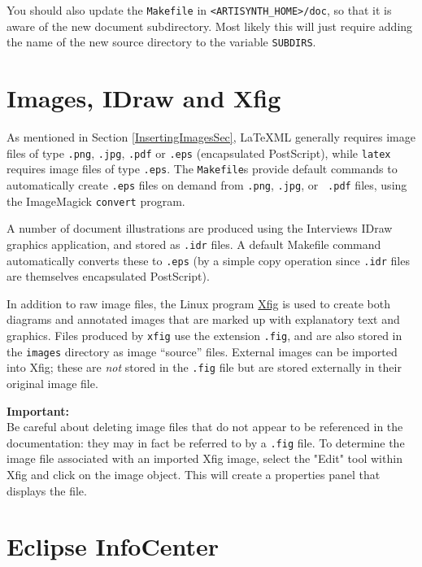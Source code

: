 \documentclass{article}
\begin{document}
You should also update the {\tt Makefile} in {\tt <ARTISYNTH\_HOME>/doc},
so that it is aware of the new document subdirectory. Most
likely this will just require adding the name of the new source
directory to the variable {\tt SUBDIRS}.

\section{Images, IDraw and Xfig}
\label{ImagesSec}

As mentioned in Section \ref{InsertingImagesSec}, LaTeXML generally
requires image files of type {\tt .png}, {\tt .jpg}, {\tt .pdf} or
{\tt .eps} (encapsulated PostScript), while 
{\tt latex} requires image files of type {\tt .eps}. 
The {\tt Makefile}s provide default commands to automatically
create {\tt .eps} files on demand from {\tt .png}, {\tt .jpg}, or {\tt
.pdf} files, using the ImageMagick {\tt convert} program. 

A number of document illustrations are produced using the Interviews
IDraw graphics application, and stored as {\tt .idr} files. A default
Makefile command automatically converts these to {\tt .eps} (by a
simple copy operation since {\tt .idr} files are themselves
encapsulated PostScript).

In addition to raw image files, the Linux program
\href{http://www.xfig.org}{Xfig} is used to create both diagrams and
annotated images that are marked up with explanatory text and
graphics.  Files produced by {\tt xfig} use the extension {\tt .fig},
and are also stored in the {\tt images} directory as image ``source''
files.  External images can be imported into Xfig; these are {\it not}
stored in the {\tt .fig} file but are stored externally in their
original image file.

\begin{sideblock}
{\bf Important:}\\ Be careful about deleting image files that do not
appear to be referenced in the documentation: they may in fact be
referred to by a {\tt .fig} file.  To determine the image file
associated with an imported Xfig image, select the "Edit" tool within
Xfig and click on the image object.  This will create a properties
panel that displays the file.
\end{sideblock}

\section{Eclipse InfoCenter}
\label{InfoCenterSec}
\end{document}
